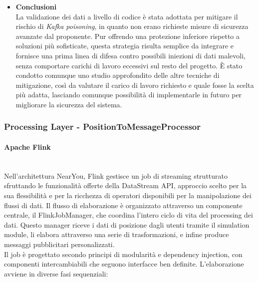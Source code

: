\documentclass[10pt]{article}
\newcommand{\myparagraph}[1]{\paragraph{#1}\mbox{}\\}
\begin{document}
\begin{itemize}
\begin{itemize}
\begin{itemize}
                \end{itemize}
            \end{itemize}
            \item \textbf{Conclusioni}\\
                La validazione dei dati a livello di codice è stata adottata per mitigare il rischio di \textit{Kafka poisoning}, in quanto non erano richieste misure di sicurezza avanzate dal proponente. Pur offrendo una protezione inferiore rispetto a soluzioni più sofisticate, questa strategia risulta semplice da integrare e fornisce una prima linea di difesa contro possibili iniezioni di dati malevoli, senza comportare carichi di lavoro eccessivi sul resto del progetto. È stato condotto comunque uno studio approfondito delle altre tecniche di mitigazione, così da valutare il carico di lavoro richiesto e quale fosse la scelta più adatta, lasciando comunque possibilità di implementarle in futuro per migliorare la sicurezza del sistema.\\
        \end{itemize}
        









        \subsubsection{Processing Layer - PositionToMessageProcessor}
        \myparagraph{Apache Flink}
        Nell'architettura NearYou, Flink gestisce un job di streaming strutturato sfruttando le funzionalità offerte della DataStream API,
        approccio scelto per la sua flessibilità e per la ricchezza di operatori disponibili per la manipolazione dei flussi di dati.
        Il flusso di elaborazione è organizzato attraverso un componente centrale, il FlinkJobManager, che coordina l'intero ciclo di vita del processing dei dati.
        Questo manager riceve i dati di posizione dagli utenti tramite il simulation module, li elabora attraverso una serie di trasformazioni, e infine produce messaggi pubblicitari personalizzati. \\
        Il job è progettato secondo principi di modularità e dependency injection, con componenti intercambiabili che seguono interfacce ben definite.
        L'elaborazione avviene in diverse fasi sequenziali:
\end{document}

